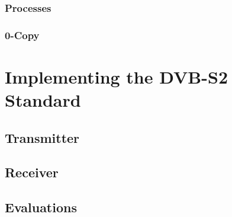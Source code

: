 \subsubsection{Processes}

\subsubsection{0-Copy}

\section{Implementing the DVB-S2 Standard}

\subsection{Transmitter}

\subsection{Receiver}

\subsection{Evaluations}
